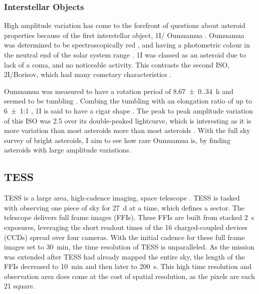 \documentclass{UCreport}
\DeclareRobustCommand{\okina}{%
  \raisebox{\dimexpr\fontcharht\font`A-\height}{%
    \scalebox{0.8}{`}%
  }%
}
\newcommand{\omuamua}{\okina Oumuamua } %
\begin{document}
\subsubsection*{Interstellar Objects}
High amplitude variation has come to the forefront of questions about asteroid properties because of the first interstellar object, 1I/\omuamua \citep[see][for a review]{Bannister2019}.
\omuamua was determined to be spectroscopically red \citep{Fitzsimmons2017, Meech2017}, and having a photometric colour in the neutral end of the solar system range \citep{Bannister2017}.
1I was classed as an asteroid due to lack of a coma, and no noticeable activity.
This contrasts the second ISO, 2I/Borisov, which had many cometary characteristics \citep[see ][for a review]{Dorofeeva2023}.

\omuamua was measured to have a rotation period of \qty{8.67(0.34)}{\hour} \citep{Belton2018} and seemed to be tumbling \citep[e.g.][]{Drahus2018,Fraser2018}.
Combing the tumbling with an elongation ratio of up to \qty{6(1)}{}:1 \citep{McNeill2018}, 1I is said to have a cigar shape \citep{Belton2018}.
The peak to peak amplitude variation of this ISO was \qty{2.5}{\mag} \citep{Meech2017} over its double-peaked lightcurve, which is interesting as it is more variation than most asteroids more than most asteroids \citep[as seen in the LCDB of][]{Warner2009}.
With the full sky survey of bright asteroids, I aim to see how rare \omuamua is, by finding asteroids with large amplitude variations.


\subsection{TESS}\label{SubSec:TESS}

TESS is a large area, high-cadence imaging, space telescope  \citep{Ricker2014}.
TESS is tasked with observing one piece of sky for \qty{27}{\day} at a time, which defines a sector.
The telescope delivers  full frame images (FFIs).
These FFIs are built from stacked \qty{2}{\second} exposures, leveraging the short readout times of the 16 charged-coupled devices (CCDs) spread over four cameras.
With the initial cadence for these full frame images set to \qty{30}{\minute}, the time resolution of TESS is unparalleled.
As the mission was extended after TESS had already mapped the entire sky, the length of the FFIs decreased to \qty{10}{\minute} and then later to \qty{200}{\second}.
This high time resolution and observation area does come at the cost of spatial resolution, as the pixels are each \qty{21}{\arcsec} square.
\end{document}
